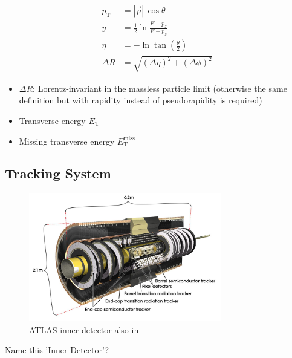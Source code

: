 \begin{align*}
  p_\text{T} &= | \vec{p} | \, \cos\theta \\
  y &= \frac{1}{2} \ln\frac{E + p_z}{E - p_z} \\
  \eta &= -\ln\tan\left( \frac{\theta}{2} \right) \\
  \Delta R &= \sqrt{(\Delta\eta)^2 + (\Delta\phi)^2}
\end{align*}

\begin{itemize}
\item $\Delta R$: Lorentz-invariant in the massless particle limit (otherwise
  the same definition but with rapidity instead of pseudorapidity is required)
\item Transverse energy $E_\text{T}$
\item Missing transverse energy $E_\text{T}^\text{miss}$
\end{itemize}

\subsection{Tracking System}
\label{sec:atlas_tracking}

\begin{figure}[ht]
  \centering
  \includegraphics[width=0.75\textwidth]{./figures/atlas/inner_detector.jpg}
  \caption{ATLAS inner detector\cite{indet_fig} also in \cite{atlas_detector}}
  \label{fig:atlas_indet}
\end{figure}

Name this 'Inner Detector'?

